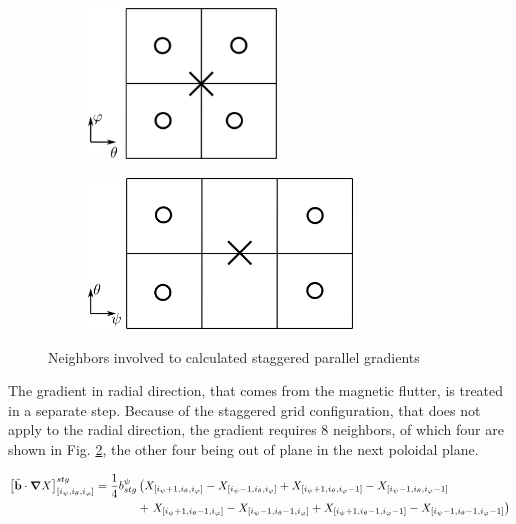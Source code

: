 \begin{figure}[H]
	\centering
	\begin{subfigure}[t]{0.40\textwidth}
		\centering
		\includegraphics[height=40mm]{schemes/GradientStencil_ThetaPhi.png}
		\label{fig:Impl_GradPara_ThetaPhi}
	\end{subfigure}
	\begin{subfigure}[t]{0.55\textwidth}
		\centering
		\includegraphics[height=40mm]{schemes/GradientStencil_PsiTheta.png}
		\label{fig:Impl_GradPara_PsiTheta}
	\end{subfigure}
	\caption{Neighbors involved to calculated staggered parallel gradients}
	\label{fig:Impl_GradPara}
\end{figure}

The gradient in radial direction, that comes from the magnetic flutter, is treated in a separate step. Because of the staggered grid configuration, that does not apply to the radial direction, the gradient requires 8 neighbors, of which four are shown in Fig. \ref{fig:Impl_GradPara_PsiTheta}, the other four being out of plane in the next poloidal plane.


\begin{align}
	\left[\tilde{\textbf{b}}\cdot\grad X \right]^{stg}_{[i_\psi,i_\theta, i_\varphi]} = \frac{1}{4}b^\psi_{stg}
	&\left( 
	  X_{[i_\psi+1,i_\theta, i_\varphi]} - X_{[i_\psi-1,i_\theta, i_\varphi]} 
	+  X_{[i_\psi+1,i_\theta, i_\varphi-1]} - X_{[i_\psi-1,i_\theta, i_\varphi-1]} \right. \nonumber \\ 
	&+ \left. X_{[i_\psi+1,i_\theta-1, i_\varphi]} - X_{[i_\psi-1,i_\theta-1, i_\varphi]} 
	+  X_{[i_\psi+1,i_\theta-1, i_\varphi-1]} - X_{[i_\psi-1,i_\theta-1, i_\varphi-1]}\right)
	\label{eq:Impl_GradParaStencil_flutter}
\end{align}



